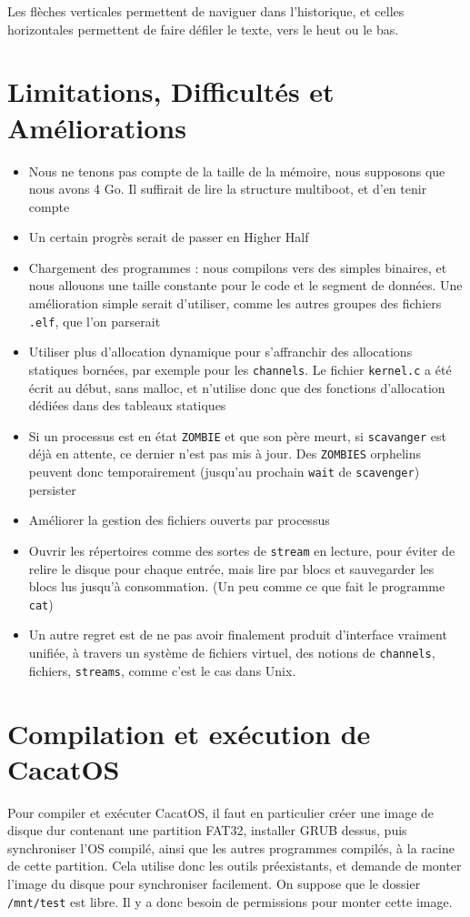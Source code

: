 \documentclass[a4paper,10pt, french]{article}
\newcommand{\code}[1]{\texttt{#1}}
\begin{document}
Les flèches verticales permettent de naviguer dans l'historique, et celles horizontales permettent
de faire défiler le texte, vers le heut ou le bas.

\section{Limitations, Difficultés et Améliorations}
\begin{itemize}
 \item Nous ne tenons pas compte de la taille de la mémoire, nous supposons que nous avons 4 Go.
 Il suffirait de lire la structure multiboot, et d'en tenir compte
 \item Un certain progrès serait de passer en Higher Half
 \item Chargement des programmes : nous compilons vers des simples binaires, et nous allouons une 
 taille constante pour le code et le segment de données. Une amélioration simple serait
 d'utiliser, comme les autres groupes des fichiers \code{.elf}, que l'on parserait
 \item Utiliser plus d'allocation dynamique pour s'affranchir des allocations statiques bornées, par exemple pour les \code{channels}. Le fichier
 \code{kernel.c} a été écrit au début, sans malloc, et n'utilise donc que des fonctions d'allocation dédiées dans des tableaux statiques
 \item Si un processus est en état \code{ZOMBIE} et que son père meurt, si \code{scavanger} est 
 déjà en attente, ce dernier n'est pas mis à jour. Des \code{ZOMBIES} orphelins peuvent donc temporairement (jusqu'au prochain \code{wait} de \code{scavenger}) persister
 \item Améliorer la gestion des fichiers ouverts par processus
 \item Ouvrir les répertoires comme des sortes de \code{stream} en lecture, pour éviter de relire le disque pour chaque
 entrée, mais lire par blocs et sauvegarder les blocs lus jusqu'à consommation. (Un peu comme ce que fait le
 programme \code{cat})
 \item Un autre regret est de ne pas avoir finalement produit d'interface vraiment unifiée, à travers un
 système de fichiers virtuel, des notions de \code{channels}, fichiers, \code{streams}, comme c'est le cas
 dans Unix.
\end{itemize}

\section{Compilation et exécution de CacatOS}
Pour compiler et exécuter CacatOS, il faut en particulier créer une image de disque dur contenant une partition FAT32,
installer GRUB dessus, puis synchroniser l'OS compilé, ainsi que les autres programmes compilés, à la racine de
cette partition.
Cela utilise donc les outils préexistants, et demande de monter l'image du disque pour synchroniser facilement.
On suppose que le dossier \code{/mnt/test} est libre.
Il y a donc besoin de permissions pour monter cette image.
\end{document}
